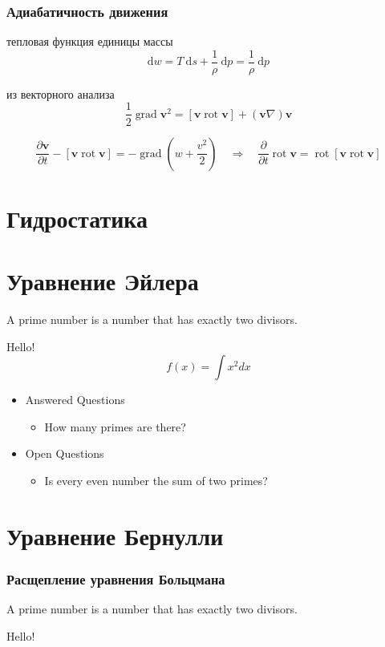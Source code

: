 \documentclass[ucs,english,russian]{beamer}
\newcommand{\dd}{\:\mathrm{d}}
\newcommand{\D}{\mathrm{d}}
\newcommand{\Hence}{\quad\Longrightarrow\quad}
\DeclareMathOperator*{\Grad}{grad}
\DeclareMathOperator*{\Rot}{rot}
\begin{document}
\begin{frame}
	\frametitle{Адиабатичность движения}
	\begin{block}{тепловая функция единицы массы}
		\[ \D w = T\dd s + \frac1\rho\dd p = \frac1\rho\dd p \]
	\end{block}
	\begin{block}{из векторного анализа}
		\[ \frac1{2}\Grad{\mathbf{v}^2} = [\mathbf{v}\Rot\mathbf{v}] + (\mathbf{v}\nabla)\mathbf{v} \]
	\end{block}
	\vspace{-20pt}
	\[
		\frac{\partial\mathbf{v}}{\partial t} - [\mathbf{v}\Rot\mathbf{v}] = -\Grad\left(w+\frac{v^2}2\right)
		\Hence \frac{\partial}{\partial t}\Rot\mathbf{v} = \Rot[\mathbf{v}\Rot\mathbf{v}]
	\]
\end{frame}

\section{Гидростатика}


\section{Уравнение Эйлера}
\begin{frame}
	\begin{definition} %
	A \alert{prime number} is a number that has exactly two divisors.
	\end{definition}
	Hello!
	\[f(x)=\int x^2 dx\]
	\begin{itemize}
	\item Answered Questions
	\begin{itemize}
	\item How many primes are there?
	\end{itemize}
	\item Open Questions
	\begin{itemize}
	\item Is every even number the sum of two primes?
	\end{itemize}
	\end{itemize}
\end{frame}

\section{Уравнение Бернулли}
\begin{frame}
 	\frametitle{Расщепление уравнения Больцмана}
	\begin{definition} %
	A \alert{prime number} is a number that has exactly two divisors.
	\end{definition}
	Hello!

\end{frame}
\end{document}

